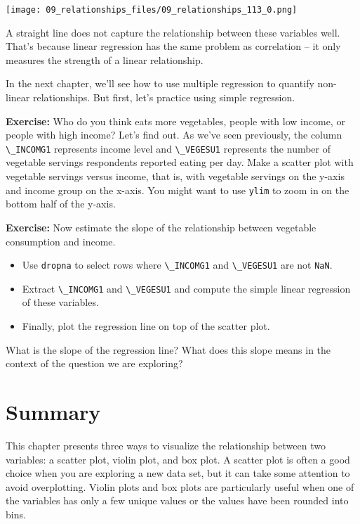 \begin{center}
\texttt{[image: 09\_relationships\_files/09\_relationships\_113\_0.png]}
\end{center}

A straight line does not capture the relationship between these
variables well. That's because linear regression has the same problem as
correlation -- it only measures the strength of a linear relationship.

In the next chapter, we'll see how to use multiple regression to
quantify non-linear relationships. But first, let's practice using
simple regression.

\textbf{Exercise:} Who do you think eats more vegetables, people with
low income, or people with high income? Let's find out. As we've seen
previously, the column \passthrough{\lstinline!\_INCOMG1!} represents
income level and \passthrough{\lstinline!\_VEGESU1!} represents the
number of vegetable servings respondents reported eating per day. Make a
scatter plot with vegetable servings versus income, that is, with
vegetable servings on the y-axis and income group on the x-axis. You
might want to use \passthrough{\lstinline!ylim!} to zoom in on the
bottom half of the y-axis.

\textbf{Exercise:} Now estimate the slope of the relationship between
vegetable consumption and income.

\begin{itemize}
\item
  Use \passthrough{\lstinline!dropna!} to select rows where
  \passthrough{\lstinline!\_INCOMG1!} and
  \passthrough{\lstinline!\_VEGESU1!} are not
  \passthrough{\lstinline!NaN!}.
\item
  Extract \passthrough{\lstinline!\_INCOMG1!} and
  \passthrough{\lstinline!\_VEGESU1!} and compute the simple linear
  regression of these variables.
\item
  Finally, plot the regression line on top of the scatter plot.
\end{itemize}

What is the slope of the regression line? What does this slope means in
the context of the question we are exploring?

\pagebreak

\section{Summary}\label{summary}

This chapter presents three ways to visualize the relationship between
two variables: a scatter plot, violin plot, and box plot. A scatter plot
is often a good choice when you are exploring a new data set, but it can
take some attention to avoid overplotting. Violin plots and box plots
are particularly useful when one of the variables has only a few unique
values or the values have been rounded into bins.

